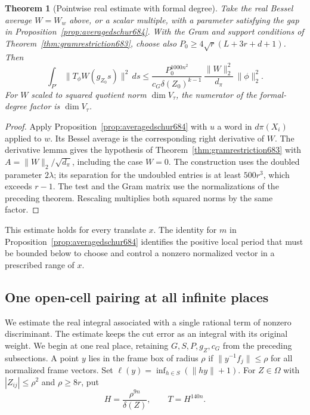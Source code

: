 \documentclass[a4paper,11pt]{article}
\newtheorem{theorem}[proposition]{Theorem}
\theoremstyle{definition}
\theoremstyle{remark}
\numberwithin{equation}{section}
\begin{document}
\begin{theorem}[Pointwise real estimate with formal degree]
\leavevmode\label{thm:archbessel684}
Take the real Bessel average \(W=W_w\) above, or a scalar multiple,
with a parameter satisfying the gap in
Proposition~\ref{prop:averagedschur684}. With the Gram and support
conditions of Theorem~\ref{thm:gramrestriction683}, choose also
\(P_0\ge4\sqrt r(L+3r+d+1)\). Then
\[
 \int_{P'}\|T_\phi W(g_{Z_0}s)\|^2\,ds
  \le \frac{P_0^{1000n^2}}{c_G\delta(Z_0)^{k-1}}\,
             \frac{\|W\|_2^2}{d_\pi}\,\|\phi\|_2^2 .
\]
For \(W\) scaled to squared quotient norm \(\dim V_\tau\), the
numerator of the formal-degree factor is \(\dim V_\tau\).
\end{theorem}
\begin{proof}
Apply Proposition~\ref{prop:averagedschur684} with \(u\) a word
in \(d\pi(X_i)\) applied to \(w\). Its Bessel average is the
corresponding right derivative of \(W\). The derivative lemma
gives the hypothesis of Theorem~\ref{thm:gramrestriction683}
with \(A=\|W\|_2/\sqrt{d_\pi}\), including the case \(W=0\).
The construction uses the doubled parameter \(2\lambda\); its
separation for the undoubled entries is at least \(500r^3\),
which exceeds \(r-1\). The test and the Gram matrix use the
normalizations of the preceding theorem. Rescaling multiplies
both squared norms by the same factor.
\end{proof}

This estimate holds for every translate \(x\). The identity for
\(m\) in Proposition~\ref{prop:averagedschur684} identifies the
positive local period that must be bounded below to choose and
control a nonzero normalized vector in a prescribed range of \(x\).


\subsection{One open-cell pairing at all infinite places}
\label{sec:realpair685}

We estimate the real integral associated with a single rational
term of nonzero discriminant. The estimate keeps the cut error
as an integral with its original weight. We begin at one real
place, retaining \(G,S,P,g_Z,c_G\) from the preceding subsections.
A point \(y\) lies in the frame box of radius \(\rho\) if
\(\|y^{-1} f_j\|\le\rho\) for all normalized frame vectors.
Set \(\ell(y)=\inf_{h\in S}(\|hy\|+1)\). For \(Z\in\Omega\)
with \(|Z_{ij}|\le\rho^2\) and \(\rho\ge8r\), put
\[
             H=\frac{\rho^{9n}}{\delta(Z)},\qquad T=H^{140n}.
\]
\end{document}
